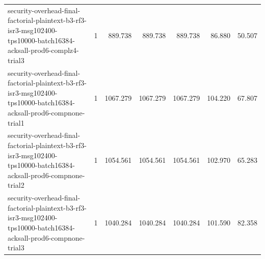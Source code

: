\begin{tabular}{lrrrrrr}
security-overhead-final-factorial-plaintext-b3-rf3-isr3-msg102400-tps10000-batch16384-acksall-prod6-complz4-trial3 & 1 & 889.738 & 889.738 & 889.738 & 86.880 & 50.507 \\
security-overhead-final-factorial-plaintext-b3-rf3-isr3-msg102400-tps10000-batch16384-acksall-prod6-compnone-trial1 & 1 & 1067.279 & 1067.279 & 1067.279 & 104.220 & 67.807 \\
security-overhead-final-factorial-plaintext-b3-rf3-isr3-msg102400-tps10000-batch16384-acksall-prod6-compnone-trial2 & 1 & 1054.561 & 1054.561 & 1054.561 & 102.970 & 65.283 \\
security-overhead-final-factorial-plaintext-b3-rf3-isr3-msg102400-tps10000-batch16384-acksall-prod6-compnone-trial3 & 1 & 1040.284 & 1040.284 & 1040.284 & 101.590 & 82.358 \\
\hline
\end{tabular}
